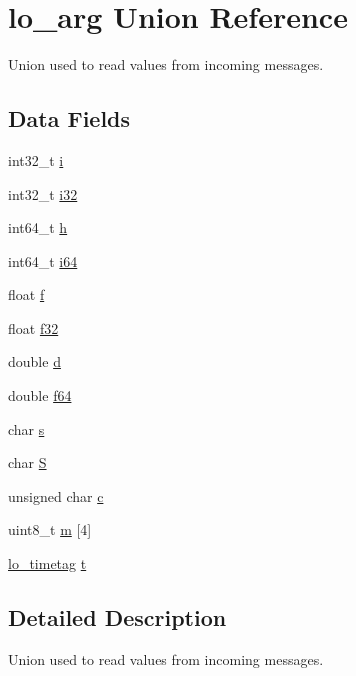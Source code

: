 \hypertarget{unionlo__arg}{\section{lo\+\_\+arg Union Reference}
\label{unionlo__arg}
}


Union used to read values from incoming messages.  


\subsection*{Data Fields}
\begin{DoxyCompactItemize}
\item 
int32\+\_\+t \hyperlink{unionlo__arg_a7eefb9548603ff68b4fbd4c4d41c648b}{i}
\item 
int32\+\_\+t \hyperlink{unionlo__arg_a07e800463dc4ec5066b01033457ca018}{i32}
\item 
int64\+\_\+t \hyperlink{unionlo__arg_a1773bb0e69aa3b137ddc26044334b2b4}{h}
\item 
int64\+\_\+t \hyperlink{unionlo__arg_afe8046a8395e9af51cc759034ccfedd5}{i64}
\item 
float \hyperlink{unionlo__arg_ad61c0f83abb077ce656b3a39d5c7e19f}{f}
\item 
float \hyperlink{unionlo__arg_a27ae2540e5e98e85826ccb7350b2ab20}{f32}
\item 
double \hyperlink{unionlo__arg_a2a690890222baa5b9971f8772cb02535}{d}
\item 
double \hyperlink{unionlo__arg_abf90442900450bb63d8d9bb4e60af4ee}{f64}
\item 
char \hyperlink{unionlo__arg_a15bbcf8284d75ad441b5cde7218548f6}{s}
\item 
char \hyperlink{unionlo__arg_ab9c6a9c09ea094d58f889ed1a5edba0b}{S}
\item 
unsigned char \hyperlink{unionlo__arg_aa2e1c99864cf46e6b9cc52fb5cb214fe}{c}
\item 
uint8\+\_\+t \hyperlink{unionlo__arg_a96d32df951c54eaff5dc67fc97a70c83}{m} \mbox{[}4\mbox{]}
\item 
\hyperlink{structlo__timetag}{lo\+\_\+timetag} \hyperlink{unionlo__arg_afc89e5569fba7a660638839366b17408}{t}
\end{DoxyCompactItemize}


\subsection{Detailed Description}
Union used to read values from incoming messages. 


